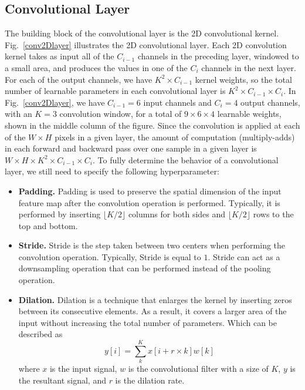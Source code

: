 \subsection{Convolutional Layer}
The building block of the convolutional layer is the 2D convolutional kernel. Fig.~\ref{conv2Dlayer} illustrates the 2D convolutional layer. Each 2D convolution kernel takes as input all of the $C_{i-1}$ channels in the preceding layer, windowed to a small area, and produces the values in one of the $C_{i}$ channels in the next layer. For each of the output channels, we have $K^2\times C_{i-1}$ kernel weights, so the total number of learnable parameters in each convolutional layer is $K^2\times C_{i-1} \times C_{i}$. In Fig.~\ref{conv2Dlayer}, we have $C_{i-1} = 6$ input channels and $C_{i} = 4$ output channels, with an $K = 3$ convolution window, for a total of $9 \times 6 \times 4$ learnable weights, shown in the middle column of the figure. Since the convolution is applied at each of the $W \times H$ pixels in a given layer, the amount of computation (multiply-adds) in each forward and backward pass
over one sample in a given layer is $W\times H \times K^{2} \times C_{i-1} \times C_{i}$.
To fully determine the behavior of a convolutional layer, we still need to specify the following hyperparameter:
\begin{itemize}
    \item \textbf{Padding.} Padding is used to preserve the spatial dimension of the input feature map after the convolution operation is performed. Typically, it is performed by inserting $\lfloor K/2 \rfloor$ columns for both sides and $\lfloor K/2 \rfloor$ rows to the top and bottom.
    \item \textbf{Stride.} Stride is the step taken between two centers when performing the convolution operation. Typically, Stride is equal to $1$. Stride can act as a downsampling operation that can be performed instead of the pooling operation.
    \item \textbf{Dilation.} Dilation is a technique that enlarges the kernel by inserting zeros between its consecutive elements. As a result, it covers a larger area of the input without increasing the total number of parameters. Which can be described as \[y[i]=\sum_{k}^{K} x[i+r\times k] w[k]\] where $x$ is the input signal, $w$ is the convolutional filter with a size of $K$, $y$ is the resultant signal, and $r$ is the dilation rate.
\end{itemize}

